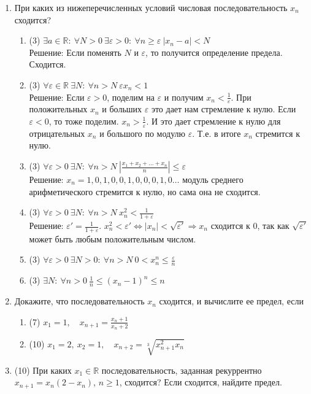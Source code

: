 \documentclass[a4paper]{article}
\def\eps{\varepsilon}
\begin{document}
\begin{enumerate}
	\item При каких из нижеперечисленных условий числовая последовательность $x_n$ сходится?
	\begin{enumerate}
	    \item (3) $\exists a\in \mathbb R:\ \forall N>0\ \exists \eps>0:\ \forall n\geq\eps\ |x_n - a|<N$\\
        Решение: Если поменять $N$ и $\eps$, то получится определение предела. Сходится.
	    \item (3) $\forall \eps\in \mathbb R\ \exists N:\ \forall n>N\ \eps x_n < 1$\\
	    Решение: Если $\eps > 0$, поделим на $\eps$ и получим $x_n < \frac{1}{\eps}$. При положительных $x_n$ и больших $\eps$ это дает нам стремление к нулю. Если $\eps < 0$, то тоже поделим. $x_n > \frac{1}{\eps}$. И это дает стремление к нулю для отрицательных $x_n$ и большого по модулю $\eps$. Т.е. в итоге $x_n$ стремится к нулю.
	    \item (3) $\forall \eps>0\ \exists N:\ \forall n>N\ \left|\frac{x_1+x_2+\dots + x_n}{n}\right|\leq \eps$\\
	    Решение: $x_n = 1, 0, 1, 0, 0, 1, 0, 0, 0, 1, 0 \dots$ модуль среднего арифметического стремится к нулю, но сама она не сходится.
	    \item (3) $\forall \eps>0\ \exists N:\ \forall n>N\ x_n^2<\frac{1}{1+\eps}$\\
	    Решение: $\eps' = \frac{1}{1+\eps}$. $x_n^2 < \eps' \Leftrightarrow |x_n| < \sqrt{\eps'} \Rightarrow x_n$ сходится к 0, так как $\sqrt{\eps'}$ может быть любым положительным числом.
	    \item (3) $\forall\eps>0\ \exists N>0:\ \forall n>N\ 0<x_n^n\leq \frac{\eps}{n}$
	    \item (3) $\exists N:\ \forall n>0\ \frac{1}{n}\leq (x_n - 1)^n \leq n$
	\end{enumerate}
    
    \item Докажите, что последовательность $x_n$ сходится, и вычислите ее предел, если
    \begin{multicols}{2}
    \begin{enumerate}
        \item (7) $x_1=1,\quad x_{n+1}=\frac{x_n + 1}{x_n + 2}$
        \item (10) $x_1 = 2,\ x_2 = 1,\quad x_{n+2} = \sqrt[3]{x_{n+1}^2x_n}$
    \end{enumerate}
    \end{multicols}
    
    \item (10) При каких $x_1\in\mathbb{R}$ последовательность, заданная рекуррентно $x_{n+1}=x_n(2-x_n)$, $n\geqslant1$, сходится? Если сходится, найдите предел.
\end{enumerate}
\end{document}
